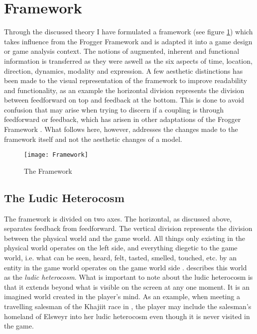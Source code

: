 \section{Framework}
Through the discussed theory I have formulated a framework (see figure \ref{framework}) which takes influence from the Frogger Framework \cite{frogger} and is adapted it into a game design or game analysis context. The notions of augmented, inherent and functional information is transferred as they were aswell as the six aspects of time, location, direction, dynamics, modality and expression. A few aesthetic distinctions has been made to the visual representation of the framework to improve readability and functionality, as an example the horizontal division represents the division between feedforward on top and feedback at the bottom. This is done to avoid confusion that may arise when trying to discern if a coupling is through feedforward or feedback, which has arisen in other adaptations of the Frogger Framework \cite{tangifrog}. What follows here, however, addresses the changes made to the framework itself and not the aesthetic changes of a model.

\begin{figure}
  \texttt{[image: Framework]}
  \caption{The Framework}
  \label{framework}
\end{figure}

\subsection{The Ludic Heterocosm}
The framework is divided on two axes. The horizontal, as discussed above, separates feedback from feedforward. The vertical division represents the division between the physical world and the game world. All things only existing in the physical world operates on the left side, and everything diegetic to the game world, i.e. what can be seen, heard, felt, tasted, smelled, touched, etc. by an entity in the game world operates on the game world side \cite{bordwell}.  describes this world as the \textit{ludic heterocosm}. What is important to note about the ludic heterocosm is that it extends beyond what is visible on the screen at any one moment. It is an imagined world created in the player's mind. As an example, when meeting a travelling salesman of the Khajiit race in , the player may include the salesman's homeland of Elsweyr into her ludic heterocosm even though it is never visited in the game.

